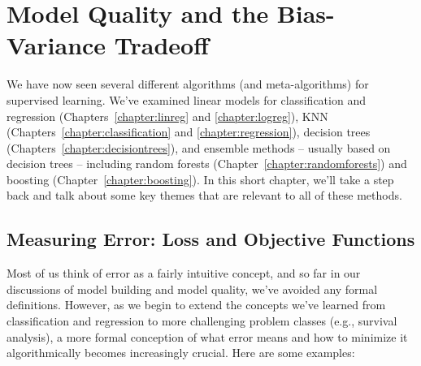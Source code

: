 \chapter{Model Quality and the Bias-Variance Tradeoff \label{chapter:biasvariance}}

We have now seen several different algorithms (and meta-algorithms) for supervised learning. We've examined linear models for classification and regression (Chapters~\ref{chapter:linreg} and \ref{chapter:logreg}), KNN (Chapters~\ref{chapter:classification} and \ref{chapter:regression}), decision trees (Chapters~\ref{chapter:decisiontrees}), and ensemble methods -- usually based on decision trees -- including random forests (Chapter~\ref{chapter:randomforests}) and boosting (Chapter~\ref{chapter:boosting}). In this short chapter, we'll take a step back and talk about some key themes that are relevant to all of these methods. 


\section{Measuring Error: Loss and Objective Functions}

Most of us think of error as a fairly intuitive concept, and so far in our discussions of model building and model quality, we've avoided any formal definitions. However, as we begin to extend the concepts we've learned from classification and regression to more challenging problem classes (e.g., survival analysis), a more formal conception of what error means and how to minimize it algorithmically becomes increasingly crucial. Here are some examples:

